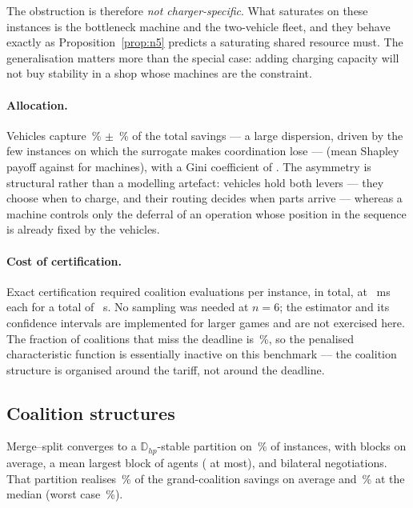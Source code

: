 \documentclass[preprint, 3p, review, 12pt]{elsarticle}
\theoremstyle{definition}
\begin{document}
The obstruction is therefore \emph{not charger-specific}. What saturates on these instances is
the bottleneck machine and the two-vehicle fleet, and they behave exactly as
Proposition~\ref{prop:n5} predicts a saturating shared resource must. The generalisation
matters more than the special case: adding charging capacity will not buy stability in a shop
whose machines are the constraint.

\paragraph{Allocation.} Vehicles capture \,\% $\pm$
\,\% of the total savings --- a large dispersion, driven by the few
instances on which the surrogate makes coordination lose --- (mean Shapley payoff
 against  for machines), with a Gini
coefficient of . The asymmetry is structural rather than a
modelling artefact: vehicles hold both levers --- they choose when to charge, and their
routing decides when parts arrive --- whereas a machine controls only the deferral of an
operation whose position in the sequence is already fixed by the vehicles.

\paragraph{Cost of certification.} Exact certification required
 coalition evaluations per instance,  in
total, at ~ms each for a total of ~s. No sampling
was needed at $n=6$; the estimator and its confidence intervals are implemented for larger
games and are not exercised here. The fraction of coalitions that miss the deadline is
\,\%, so the penalised characteristic function is
essentially inactive on this benchmark --- the coalition structure is organised around the
tariff, not around the deadline.

\subsection{Coalition structures}
\label{sec:res-cs}
Merge--split converges to a $\mathbb{D}_{hp}$-stable partition on
\,\% of instances, with  blocks on average, a mean largest block of
 agents ( at most), and
 bilateral negotiations. That partition realises \,\% of the grand-coalition
savings on average and \,\% at the median (worst case
\,\%).
\end{document}
